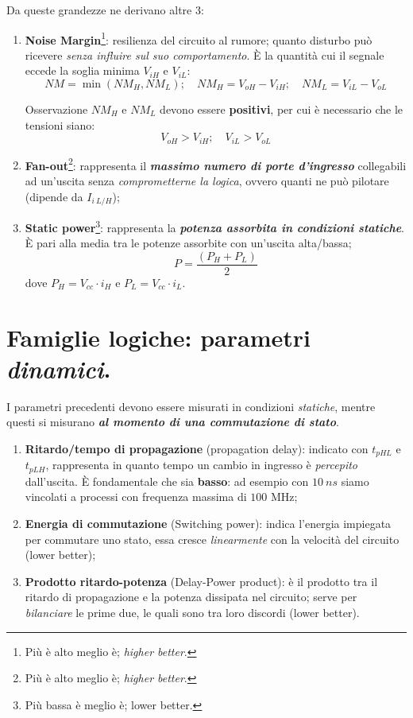 \documentclass[
]{book}
\providecommand{\tightlist}{%
  \setlength{\itemsep}{0pt}\setlength{\parskip}{0pt}}
\begin{document}
Da queste grandezze ne derivano altre 3:

\begin{enumerate}
\def\labelenumi{\arabic{enumi})}
\setcounter{enumi}{3}
\tightlist
\item
  \textbf{Noise Margin}\footnote{Più è alto meglio è; \emph{higher
    better}.}: resilienza del circuito al rumore; quanto disturbo può
  ricevere \emph{senza influire sul suo comportamento}. È la quantità
  cui il segnale eccede la soglia minima \(V_{iH}\) e \(V_{iL}\): \[
   NM=\min(NM_{H}, NM_{L}); \quad NM_{H}=V_{oH}-V_{iH}; \quad NM_{L}=V_{iL}-V_{oL}
   \]

  \begin{bluebox}{Osservazione}
  $NM_{H}$ e $NM_{L}$ devono essere \textbf{positivi}, per cui è necessario che le tensioni siano:
  $$
  V_{oH}>V_{iH};\quad V_{iL}>V_{oL}
  $$
  \end{bluebox}
\item
  \textbf{Fan-out}\footnote{Più è alto meglio è; \emph{higher better}.}:
  rappresenta il \textbf{\emph{massimo numero di porte d'ingresso}}
  collegabili ad un'uscita senza \emph{comprometterne la logica}, ovvero
  quanti ne può pilotare (dipende da \(I_{i\:L/H}\));
\item
  \textbf{Static power}\footnote{Più bassa è meglio è; lower better.}:
  rappresenta la \textbf{\emph{potenza assorbita in condizioni
  statiche}}. È pari alla media tra le potenze assorbite con un'uscita
  alta/bassa; \[
   P=\frac{(P_{H}+P_{L})}{2}
   \] dove \(P_H = V_{cc}\cdot i_H\) e \(P_L=V_{cc}\cdot i_L\).
\end{enumerate}

\section{\texorpdfstring{Famiglie logiche: parametri
\emph{dinamici}.}{Famiglie logiche: parametri dinamici.}}\label{famiglie-logiche-parametri-dinamici.}

I parametri precedenti devono essere misurati in condizioni
\emph{statiche}, mentre questi si misurano \textbf{\emph{al momento di
una commutazione di stato}}.

\begin{enumerate}
\def\labelenumi{\arabic{enumi})}
\tightlist
\item
  \textbf{Ritardo/tempo di propagazione} (propagation delay): indicato
  con \(t_{pHL}\) e \(t_{pLH}\), rappresenta in quanto tempo un cambio
  in ingresso è \emph{percepito} dall'uscita. È fondamentale che sia
  \textbf{basso}: ad esempio con \(10\:ns\) siamo vincolati a processi
  con frequenza massima di \(100\) MHz;
\item
  \textbf{Energia di commutazione} (Switching power): indica l'energia
  impiegata per commutare uno stato, essa cresce \emph{linearmente} con
  la velocità del circuito (lower better);
\item
  \textbf{Prodotto ritardo-potenza} (Delay-Power product): è il prodotto
  tra il ritardo di propagazione e la potenza dissipata nel circuito;
  serve per \emph{bilanciare} le prime due, le quali sono tra loro
  discordi (lower better).
\end{enumerate}
\end{document}
